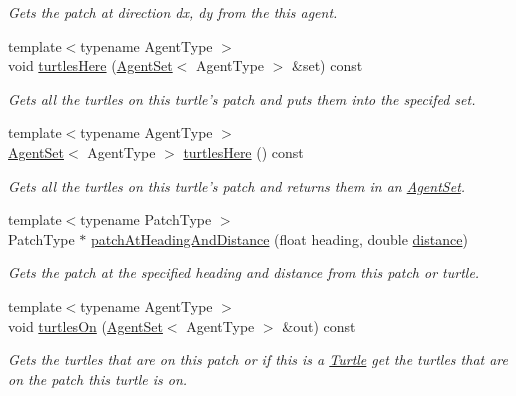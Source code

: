 \begin{DoxyCompactItemize}
\begin{DoxyCompactList}\small\item\em Gets the patch at direction dx, dy from the this agent. \end{DoxyCompactList}\item 
{\footnotesize template$<$typename Agent\-Type $>$ }\\void \hyperlink{classrepast_1_1relogo_1_1_abstract_relogo_agent_aac0b1c2047d71efb46b99423b3ecb94b}{turtles\-Here} (\hyperlink{classrepast_1_1relogo_1_1_agent_set}{Agent\-Set}$<$ Agent\-Type $>$ \&set) const 
\begin{DoxyCompactList}\small\item\em Gets all the turtles on this turtle's patch and puts them into the specifed set. \end{DoxyCompactList}\item 
{\footnotesize template$<$typename Agent\-Type $>$ }\\\hyperlink{classrepast_1_1relogo_1_1_agent_set}{Agent\-Set}$<$ Agent\-Type $>$ \hyperlink{classrepast_1_1relogo_1_1_abstract_relogo_agent_a3bc15fe92588f63ad827a519137b98fc}{turtles\-Here} () const 
\begin{DoxyCompactList}\small\item\em Gets all the turtles on this turtle's patch and returns them in an \hyperlink{classrepast_1_1relogo_1_1_agent_set}{Agent\-Set}. \end{DoxyCompactList}\item 
{\footnotesize template$<$typename Patch\-Type $>$ }\\Patch\-Type $\ast$ \hyperlink{classrepast_1_1relogo_1_1_abstract_relogo_agent_ad06a915908d6a0597b707e458c1fd5de}{patch\-At\-Heading\-And\-Distance} (float heading, double \hyperlink{classrepast_1_1relogo_1_1_relogo_agent_a12a186ace28dcebf62faa6d3441f8a78}{distance})
\begin{DoxyCompactList}\small\item\em Gets the patch at the specified heading and distance from this patch or turtle. \end{DoxyCompactList}\item 
{\footnotesize template$<$typename Agent\-Type $>$ }\\void \hyperlink{classrepast_1_1relogo_1_1_abstract_relogo_agent_acf2f1f0e0acc8052de997140c8aadec8}{turtles\-On} (\hyperlink{classrepast_1_1relogo_1_1_agent_set}{Agent\-Set}$<$ Agent\-Type $>$ \&out) const 
\begin{DoxyCompactList}\small\item\em Gets the turtles that are on this patch or if this is a \hyperlink{classrepast_1_1relogo_1_1_turtle}{Turtle} get the turtles that are on the patch this turtle is on. \end{DoxyCompactList}\item 

\end{DoxyCompactItemize}

